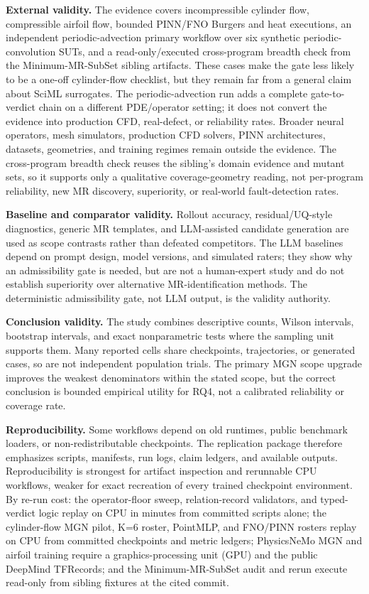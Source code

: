 \documentclass[preprint,12pt,authoryear]{elsarticle}
\begin{document}
\textbf{External validity.} The evidence covers incompressible cylinder flow, compressible airfoil flow, bounded PINN/FNO Burgers and heat executions, an independent periodic-advection primary workflow over six synthetic periodic-convolution SUTs, and a read-only/executed cross-program breadth check from the Minimum-MR-SubSet sibling artifacts. These cases make the gate less likely to be a one-off cylinder-flow checklist, but they remain far from a general claim about SciML surrogates. The periodic-advection run adds a complete gate-to-verdict chain on a different PDE/operator setting; it does not convert the evidence into production CFD, real-defect, or reliability rates. Broader neural operators, mesh simulators, production CFD solvers, PINN architectures, datasets, geometries, and training regimes remain outside the evidence. The cross-program breadth check reuses the sibling's domain evidence and mutant sets, so it supports only a qualitative coverage-geometry reading, not per-program reliability, new MR discovery, superiority, or real-world fault-detection rates.

\textbf{Baseline and comparator validity.} Rollout accuracy, residual/UQ-style diagnostics, generic MR templates, and LLM-assisted candidate generation are used as scope contrasts rather than defeated competitors. The LLM baselines depend on prompt design, model versions, and simulated raters; they show why an admissibility gate is needed, but are not a human-expert study and do not establish superiority over alternative MR-identification methods. The deterministic admissibility gate, not LLM output, is the validity authority.

\textbf{Conclusion validity.} The study combines descriptive counts, Wilson intervals, bootstrap intervals, and exact nonparametric tests where the sampling unit supports them. Many reported cells share checkpoints, trajectories, or generated cases, so are not independent population trials. The primary MGN scope upgrade improves the weakest denominators within the stated scope, but the correct conclusion is bounded empirical utility for RQ4, not a calibrated reliability or coverage rate.

\textbf{Reproducibility.} Some workflows depend on old runtimes, public benchmark loaders, or non-redistributable checkpoints. The replication package therefore emphasizes scripts, manifests, run logs, claim ledgers, and available outputs. Reproducibility is strongest for artifact inspection and rerunnable CPU workflows, weaker for exact recreation of every trained checkpoint environment. By re-run cost: the operator-floor sweep, relation-record validators, and typed-verdict logic replay on CPU in minutes from committed scripts alone; the cylinder-flow MGN pilot, K=6 roster, PointMLP, and FNO/PINN rosters replay on CPU from committed checkpoints and metric ledgers; PhysicsNeMo MGN and airfoil training require a graphics-processing unit (GPU) and the public DeepMind TFRecords; and the Minimum-MR-SubSet audit and rerun execute read-only from sibling fixtures at the cited commit.
\end{document}
